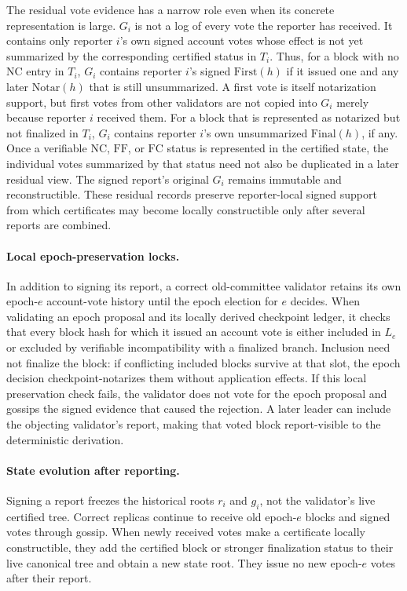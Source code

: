 \documentclass[10pt,twocolumn]{article}
\newcommand{\NC}{\mathrm{NC}}
\newcommand{\FC}{\mathrm{FC}}
\newcommand{\FF}{\mathrm{FF}}
\newcommand{\First}{\mathrm{First}}
\newcommand{\Notar}{\mathrm{Notar}}
\newcommand{\Final}{\mathrm{Final}}
\begin{document}
The residual vote evidence has a narrow role even when its concrete representation is large. $G_i$ is not a log of every vote the reporter has received. It contains only reporter $i$'s own signed account votes whose effect is not yet summarized by the corresponding certified status in $T_i$. Thus, for a block with no $\NC$ entry in $T_i$, $G_i$ contains reporter $i$'s signed $\First(h)$ if it issued one and any later $\Notar(h)$ that is still unsummarized. A first vote is itself notarization support, but first votes from other validators are not copied into $G_i$ merely because reporter $i$ received them. For a block that is represented as notarized but not finalized in $T_i$, $G_i$ contains reporter $i$'s own unsummarized $\Final(h)$, if any. Once a verifiable $\NC$, $\FF$, or $\FC$ status is represented in the certified state, the individual votes summarized by that status need not also be duplicated in a later residual view. The signed report's original $G_i$ remains immutable and reconstructible. These residual records preserve reporter-local signed support from which certificates may become locally constructible only after several reports are combined.

\paragraph{Local epoch-preservation locks.} In addition to signing its report, a correct old-committee validator retains its own epoch-$e$ account-vote history until the epoch election for $e$ decides. When validating an epoch proposal and its locally derived checkpoint ledger, it checks that every block hash for which it issued an account vote is either included in $L_e$ or excluded by verifiable incompatibility with a finalized branch. Inclusion need not finalize the block: if conflicting included blocks survive at that slot, the epoch decision checkpoint-notarizes them without application effects. If this local preservation check fails, the validator does not vote for the epoch proposal and gossips the signed evidence that caused the rejection. A later leader can include the objecting validator's report, making that voted block report-visible to the deterministic derivation.

\paragraph{State evolution after reporting.} Signing a report freezes the historical roots $r_i$ and $g_i$, not the validator's live certified tree. Correct replicas continue to receive old epoch-$e$ blocks and signed votes through gossip. When newly received votes make a certificate locally constructible, they add the certified block or stronger finalization status to their live canonical tree and obtain a new state root. They issue no new epoch-$e$ votes after their report.
\end{document}
